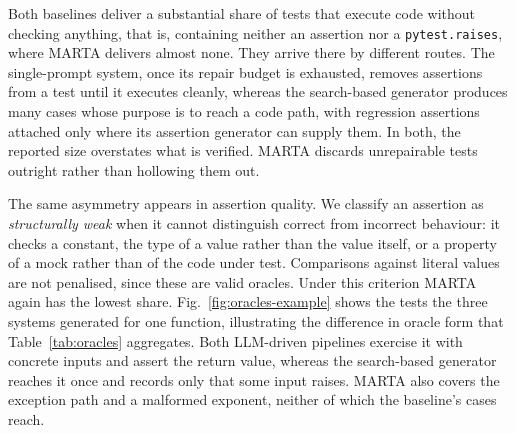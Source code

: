 \documentclass{llncs}
\begin{document}
Both baselines deliver a substantial share of tests that execute code without
checking anything, that is, containing neither an assertion nor a
\texttt{pytest.raises}, where MARTA delivers almost none. They arrive there by
different routes. The
single-prompt system, once its repair budget is exhausted, removes assertions from a
test until it executes cleanly, whereas the search-based generator produces many
cases whose purpose is to reach a code path, with regression assertions attached only
where its assertion generator can supply them. In both, the reported size overstates what is verified. MARTA discards unrepairable tests outright rather than
hollowing them out.


The same asymmetry appears in assertion quality. We classify an assertion as
\emph{structurally weak} when it cannot distinguish correct from incorrect behaviour:
it checks a constant, the type of a value rather than the value itself, or a property
of a mock rather than of the code under test. Comparisons against literal values are
not penalised, since these are valid oracles. Under this criterion MARTA again has the lowest
share. Fig.~\ref{fig:oracles-example} shows the tests the three systems generated for
one function, illustrating the difference in oracle form that Table~\ref{tab:oracles}
aggregates. Both LLM-driven pipelines exercise it with concrete inputs and assert the return value, whereas the search-based generator reaches it once and records only that some input raises. MARTA also covers the exception path and a malformed exponent, neither of which the baseline's cases reach.
\end{document}
